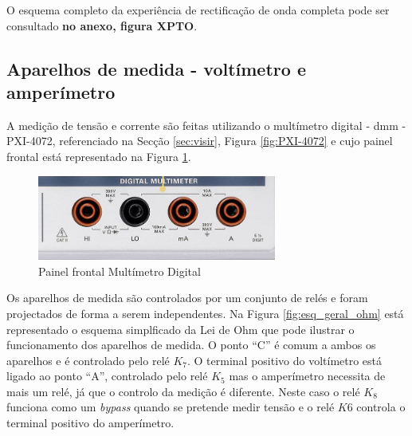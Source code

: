 O esquema completo da experiência de rectificação de onda completa pode ser consultado \textbf{no anexo, figura XPTO}.




\subsection{Aparelhos de medida - voltímetro e amperímetro}
\label{sec:aparelhosmedida}

A medição de tensão e corrente são feitas utilizando o multímetro digital - \Acrfull{dmm} - PXI-4072, referenciado na Secção \ref{sec:visir}, Figura \ref{fig:PXI-4072} e cujo painel frontal está representado na Figura \ref{fig:frontDMM}.

\begin{figure}[hbtp]
	\centering
	\includegraphics[width=0.7\textwidth]{figures/promenorDMM.png}
	\caption{Painel frontal Multímetro Digital}
	\label{fig:frontDMM}
\end{figure}

Os aparelhos de medida são controlados por um conjunto de relés e foram projectados de forma a serem independentes. Na Figura \ref{fig:esq_geral_ohm} está representado o esquema simplficado da Lei de Ohm que pode ilustrar o funcionamento dos aparelhos de medida. O ponto ``C'' é comum a ambos os aparelhos e é controlado pelo relé $K_{7}$. O terminal positivo do voltímetro está ligado ao ponto ``A'', controlado pelo relé $K_{5}$ mas o amperímetro necessita de mais um relé, já que o controlo da medição é diferente. Neste caso o relé $K_{8}$ funciona como um \textit{bypass} quando se pretende medir tensão e o relé $K{6}$ controla o terminal positivo do amperímetro.

